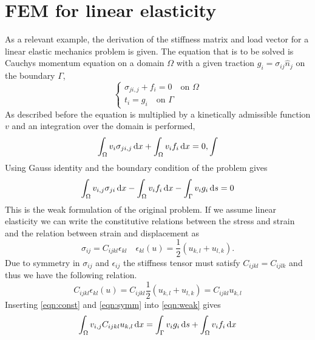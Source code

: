 \documentclass[fem.tex]{subfiles}
\begin{document}
\section{FEM for linear elasticity}
As a relevant example, the derivation of the stiffness matrix and load vector for a linear elastic mechanics problem is given. The equation that is to be solved is Cauchys momentum equation on a domain $\Omega$ with a given traction $g_i = \sigma_{ij} \hat{n}_j$ on the boundary $\Gamma$,
\begin{equation} 
\left\{
\begin{array}{ll}
   \sigma_{ji,j} + f_i = 0 \quad \text{on } \Omega \\
   t_i = g_i \quad \text{on } \Gamma \end{array} \right.
    \label{eqn:cond}
\end{equation}
%
As described before the equation is multiplied by a kinetically admissible function $v$ and an integration over the domain is performed,
%
\begin{equation} 
  \int_\Omega  v_i\sigma_{ji,j} \, \mathrm{d} x + \int_\Omega v_i f_i \, \mathrm{d} x = 0, 
  \int
    \label{eqn:cond}
\end{equation}
%
Using Gauss identity and the boundary condition of the problem gives
%
\begin{equation} 
  \int_\Omega  v_{i,j} \sigma_{ji} \, \mathrm{d} x  - \int_\Omega v_i f_i \, \mathrm{d} x - \int_\Gamma v_i g_i \, \mathrm{d} s = 0
    \label{eqn:weak}
\end{equation}
%
 This is the weak formulation of the original problem. If we assume linear elasticity we can write the constitutive relations between the stress and strain and the relation between strain and displacement as
%
\begin{equation}
\label{eqn:const} 
\sigma_{ij} = C_{ijkl} \epsilon_{kl} \quad  \epsilon_{kl}(u) = \frac{1}{2} \left(u_{k,l} + u_{l,k}\right). 
\end{equation}
%
Due to symmetry in $\sigma_{ij}$ and $\epsilon_{ij}$ the stiffness tensor must satisfy $C_{ijkl} = C_{ijlk}$ and thus we have the following relation.
%
\begin{equation}
\label{eqn:symm}
 C_{ijkl}\epsilon_{kl} (u) = C_{ijkl}\frac{1}{2} \left(u_{k,l} + u_{l,k}\right) = C_{ijkl}u_{k,l} 
\end{equation}
%
Inserting \ref{eqn:const} and \ref{eqn:symm} into \ref{eqn:weak} gives
%
\begin{equation} 
  \int_\Omega  v_{i,j} C_{ijkl} u_{k,l} \, \mathrm{d} x = \int_\Gamma v_i g_i \, \mathrm{d} s + \int_\Omega v_i f_i \, \mathrm{d} x
    \label{eqn:weak_2}
\end{equation}
\end{document}
